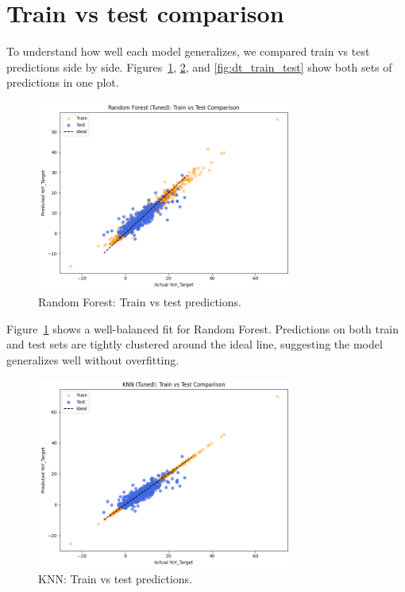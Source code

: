 \section{Train vs test comparison}

To understand how well each model generalizes, we compared train vs test predictions side by side. Figures~\ref{fig:rf_train_test}, \ref{fig:knn_train_test}, and \ref{fig:dt_train_test} show both sets of predictions in one plot.

\begin{figure}[!ht]
    \centering
    \includegraphics[width=0.75\textwidth]{figures/RF2.png}
    \caption{Random Forest: Train vs test predictions.}
    \label{fig:rf_train_test}
\end{figure}
\FloatBarrier

Figure~\ref{fig:rf_train_test} shows a well-balanced fit for Random Forest. Predictions on both train and test sets are tightly clustered around the ideal line, suggesting the model generalizes well without overfitting.

\begin{figure}[!ht]
    \centering
    \includegraphics[width=0.75\textwidth]{figures/KNN2.png}
    \caption{KNN: Train vs test predictions.}
    \label{fig:knn_train_test}
\end{figure}
\FloatBarrier

